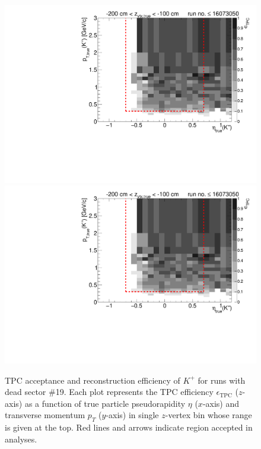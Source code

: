 \begin{figure}[hb]
\caption[TPC acceptance and reconstruction efficiency of $K^{+}$ for runs with dead sector \#19.]{TPC acceptance and reconstruction efficiency of $K^{+}$ for runs with dead sector \#19. Each plot represents the TPC efficiency $\epsilon_{\text{TPC}}$ ($z$-axis) as a function of true particle pseudorapidity $\eta$ ($x$-axis) and transverse momentum $p_{T}$ ($y$-axis) in single $z$-vertex bin whose range is given at the top. Red lines and arrows indicate region accepted in analyses.}\label{fig:tpcEff_kaon_plus}
\centering
\parbox{0.495\textwidth}{
  \centering
  \includegraphics[width=\linewidth,page=3]{graphics/eff/Eff2D_TPC_kaon_Plus_RunRange1.pdf}\\
  \includegraphics[width=\linewidth,page=5]{graphics/eff/Eff2D_TPC_kaon_Plus_RunRange1.pdf}\\
}
\end{figure}
